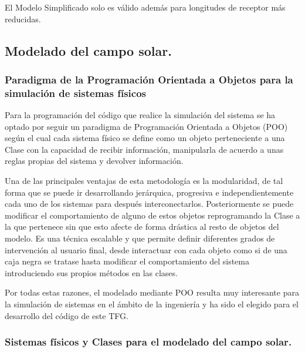 \documentclass[11pt]{article}
\begin{document}
El Modelo Simplificado solo es válido además para longitudes de receptor
más reducidas.

    \hypertarget{modelado-del-campo-solar.}{%
\subsection{Modelado del campo solar.}\label{modelado-del-campo-solar.}}

\hypertarget{paradigma-de-la-programaciuxf3n-orientada-a-objetos-para-la-simulaciuxf3n-de-sistemas-fuxedsicos}{%
\subsubsection{Paradigma de la Programación Orientada a Objetos para la
simulación de sistemas
físicos}\label{paradigma-de-la-programaciuxf3n-orientada-a-objetos-para-la-simulaciuxf3n-de-sistemas-fuxedsicos}}

Para la programación del código que realice la simulación del sistema se
ha optado por seguir un paradigma de Programación Orientada a Objetos
(POO) según el cual cada sistema físico se define como un objeto
perteneciente a una Clase con la capacidad de recibir información,
manipularla de acuerdo a unas reglas propias del sistema y devolver
información.

Una de las principales ventajas de esta metodología es la modularidad,
de tal forma que se puede ir desarrollando jerárquica, progresiva e
independientemente cada uno de los sistemas para después
interconectarlos. Posteriormente se puede modificar el comportamiento de
alguno de estos objetos reprogramando la Clase a la que pertenece sin
que esto afecte de forma drástica al resto de objetos del modelo. Es una
técnica escalable y que permite definir diferentes grados de
intervención al usuario final, desde interactuar con cada objeto como si
de una caja negra se tratase hasta modificar el comportamiento del
sistema introduciendo sus propios métodos en las clases.

Por todas estas razones, el modelado mediante POO resulta muy
interesante para la simulación de sistemas en el ámbito de la ingeniería
y ha sido el elegido para el desarrollo del código de este TFG.

\hypertarget{sistemas-fuxedsicos-y-clases-para-el-modelado-del-campo-solar.}{%
\subsubsection{Sistemas físicos y Clases para el modelado del campo
solar.}\label{sistemas-fuxedsicos-y-clases-para-el-modelado-del-campo-solar.}}
\end{document}
